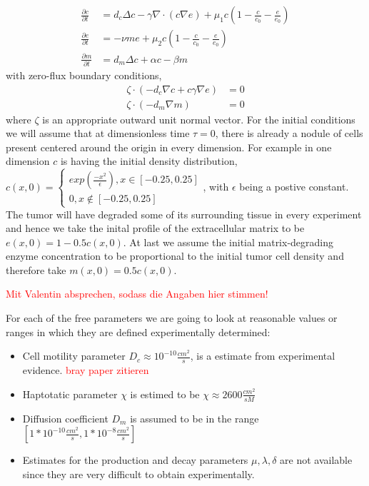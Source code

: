 \begin{align*}
	\frac{\partial c}{\partial t} &= d_c \Delta c - \gamma \nabla \cdot (c\nabla e)  + \mu_1 c\left(1-\frac{c}{c_0}-\frac{e}{e_0}\right)
    \\
	\frac{\partial e}{\partial t} &= -\nu m e  + \mu_2 c\left(1-\frac{c}{c_0}-\frac{e}{e_0}\right)\\
	\frac{\partial m}{\partial t} &= d_m \Delta c + \alpha c - \beta m
\end{align*}
with zero-flux boundary conditions, 
\begin{align*}
	\zeta \cdot (-d_c \nabla c + c \gamma \nabla e) &= 0 \\
	\zeta \cdot (-d_m\nabla m ) &= 0
\end{align*}
where $\zeta$ is an appropriate outward unit normal vector.\newline 
For the initial conditions we will assume that at dimensionless time $\tau = 0$, there is already a nodule of cells present centered around the origin in every dimension. For example in one dimension $c$ is having the initial density distribution,
$
c(x,0)=
\begin{cases}
exp(\frac{-x^2}{\epsilon}), x\in [-0.25, 0.25]\\
0, x\notin [-0.25,0.25]
\end{cases}
$, with $\epsilon$ being a postive constant. 
The tumor will have degraded some of its surrounding tissue in every experiment and hence we take the inital profile of the extracellular matrix to be $e(x,0) = 1 - 0.5 c(x,0)$. At last we assume the initial matrix-degrading enzyme concentration to be proportional to the initial tumor cell density and therefore take $m(x,0) = 0.5 c(x,0)$.

\textcolor{red}{Mit Valentin absprechen, sodass die Angaben hier stimmen!}

For each of the free parameters we are going to look at reasonable values or ranges in which they are defined experimentally determined: 
\begin{itemize}
    \item Cell motility parameter $D_c \approx 10^{-10} \frac{cm^2}{s}$, is a estimate from experimental evidence. \textcolor{red}{bray paper zitieren}
    \item Haptotatic parameter $\chi$ is estimed to be $\chi \approx 2600 \frac{cm^2}{sM}$
    \item Diffusion coefficient $D_m$ is assumed to be in the range $[1* 10^{-10} \frac{cm^2}{s},1* 10^{-8} \frac{cm^2}{s}]$
    \item Estimates for the production and decay parameters $\mu, \lambda, \delta$ are not available since they are very difficult to obtain experimentally. 
\end{itemize}

